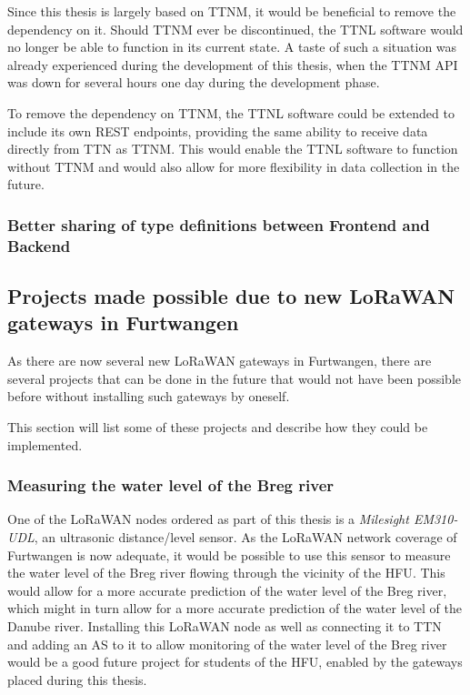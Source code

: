 Since this thesis is largely based on \ac{TTNM}, it would be beneficial to remove the dependency on it.
Should \ac{TTNM} ever be discontinued, the \ac{TTNL} software would no longer be able to function in its current state.
A taste of such a situation was already experienced during the development of this thesis, when the \ac{TTNM} \ac{API} was down for several hours one day during the development phase.

To remove the dependency on \ac{TTNM}, the \ac{TTNL} software could be extended to include its own \ac{REST} endpoints, providing the same ability to receive data directly from \ac{TTN} as \ac{TTNM}.
This would enable the \ac{TTNL} software to function without \ac{TTNM} and would also allow for more flexibility in data collection in the future.

\subsubsection{Better sharing of type definitions between Frontend and Backend}

\subsection{Projects made possible due to new \acs{LoRaWAN} gateways in Furtwangen}


As there are now several new \ac{LoRaWAN} gateways in Furtwangen, there are several projects that can be done in the future that would not have been possible before without installing such gateways by oneself.

This section will list some of these projects and describe how they could be implemented.

\subsubsection{Measuring the water level of the Breg river}

One of the \ac{LoRaWAN} nodes ordered as part of this thesis is a \emph{Milesight EM310-UDL}, an ultrasonic distance/level sensor.
As the \ac{LoRaWAN} network coverage of Furtwangen is now adequate, it would be possible to use this sensor to measure the water level of the Breg river flowing through the vicinity of the \ac{HFU}.
This would allow for a more accurate prediction of the water level of the Breg river, which might in turn allow for a more accurate prediction of the water level of the Danube river.
Installing this \ac{LoRaWAN} node as well as connecting it to \ac{TTN} and adding an \acf{AS} to it to allow monitoring of the water level of the Breg river would be a good future project for students of the \ac{HFU}, enabled by the gateways placed during this thesis.

